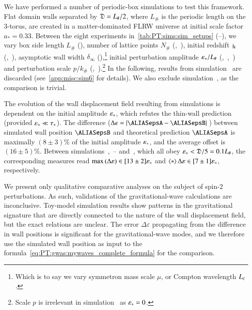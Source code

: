 We have performed a number of periodic-box simulations to test this framework. Flat domain walls separated by $\mathfrak{D}=L_\#/2$, where $L_\#$ is the periodic length on the 3-torus, are created in a matter-dominated FLRW universe at initial  scale factor $a_\ast=0.33$. Between the eight experiments in~\cref{tab:PT:sims:sim_setups} (--), we vary 
box side length $L_\#$ (), 
number of lattice points $N_\#$ (,~), 
initial redshift $\mathfrak{z}_\mathrm{i}$ (,~), 
asymptotic wall width $\delta_\infty$ (),\footnote{Which is to say we vary symmetron mass scale $\mu$, or Compton wavelength $L_{\text{\tiny{C}}}$.} %
initial perturbation amplitude $\varepsilon_\ast/L_\#$ (,~,~) and 
perturbation scale $p/k_\#$ (,~).\footnote{Scale $p$ is irrelevant in simulation~ as $\varepsilon_\ast=0$.} In the following, results from simulation~ are discarded (see~\cref{app:misc:sim6} for details). We also exclude simulation~, as the comparison is trivial.


The evolution of the wall displacement field resulting from simulations is dependent on the initial amplitude $\varepsilon_\ast$, 
which refutes the thin-wall prediction 
(provided $\varepsilon_\ast \ll \tau_\ast$). 
The difference ($\Delta \epsilon=\abs*{\epsA-\epsB}$) between simulated wall position $\epsB$ and theoretical prediction $\epsA$ is maximally $(8\pm 3)\%$ of the initial amplitude $\varepsilon_\ast$, and the average offset is
$(16\pm 5)\%$. Between simulations~,~-- and~, which all obey $\varepsilon_\ast< \mathfrak{D}/5=0.1L_\#$, the corresponding measures read $\max{(\Delta\varepsilon)} \in [13\pm 2]\varepsilon_\ast$ and $\left\langle{*}\right\rangle{\Delta \varepsilon}\in [7\pm 1]\varepsilon_\ast$, respectively. 


We present only qualitative comparative analyses on the subject of spin-2 perturbations. 
As such, validations of the gravitational-wave calculations are inconclusive. Toy-model simulation results show patterns in the gravitational signature that are directly connected to the nature of the wall displacement field, but the exact relations are unclear. %
The error $\Delta \varepsilon$ propagating from the difference in wall positions %
is significant for the gravitational-wave modes, and we therefore use the simulated wall position as input to the formula~\cref{eq:PT:gwas:mywaves_complete_formula} for the comparison.



